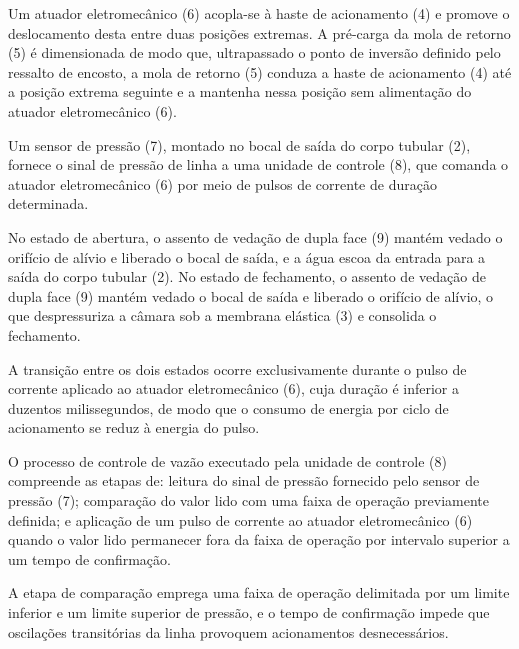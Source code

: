 \pnum Um atuador eletromecânico (6) acopla-se à haste de acionamento (4) e
promove o deslocamento desta entre duas posições extremas. A pré-carga da mola
de retorno (5) é dimensionada de modo que, ultrapassado o ponto de inversão
definido pelo ressalto de encosto, a mola de retorno (5) conduza a haste de
acionamento (4) até a posição extrema seguinte e a mantenha nessa posição sem
alimentação do atuador eletromecânico (6).

\pnum Um sensor de pressão (7), montado no bocal de saída do corpo tubular (2),
fornece o sinal de pressão de linha a uma unidade de controle (8), que comanda
o atuador eletromecânico (6) por meio de pulsos de corrente de duração
determinada.


\pnum No estado de abertura, o assento de vedação de dupla face (9) mantém
vedado o orifício de alívio e liberado o bocal de saída, e a água escoa da
entrada para a saída do corpo tubular (2). No estado de fechamento, o assento
de vedação de dupla face (9) mantém vedado o bocal de saída e liberado o
orifício de alívio, o que despressuriza a câmara sob a membrana elástica (3) e
consolida o fechamento.

\pnum A transição entre os dois estados ocorre exclusivamente durante o pulso
de corrente aplicado ao atuador eletromecânico (6), cuja duração é inferior a
duzentos milissegundos, de modo que o consumo de energia por ciclo de
acionamento se reduz à energia do pulso.

\pnum O processo de controle de vazão executado pela unidade de controle (8)
compreende as etapas de: leitura do sinal de pressão fornecido pelo sensor de
pressão (7); comparação do valor lido com uma faixa de operação previamente
definida; e aplicação de um pulso de corrente ao atuador eletromecânico (6)
quando o valor lido permanecer fora da faixa de operação por intervalo superior
a um tempo de confirmação.

\pnum A etapa de comparação emprega uma faixa de operação delimitada por um
limite inferior e um limite superior de pressão, e o tempo de confirmação
impede que oscilações transitórias da linha provoquem acionamentos
desnecessários.
